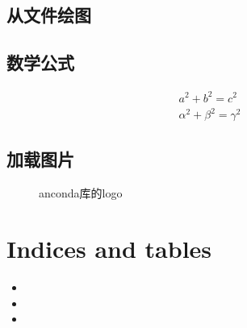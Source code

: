 \documentclass[letterpaper,10pt,english]{sphinxmanual}
\begin{document}
\begin{figure}[htbp]
\centering

\noindent{}
\end{figure}


\section{从文件绘图}
\label{\detokenize{index:id6}}
\begin{figure}[htbp]
\centering

\noindent{}
\end{figure}


\section{数学公式}
\label{\detokenize{index:id7}}\begin{equation*}
\begin{split}a^2 + b^2 = c^2 \\
\alpha^2 + \beta^2 = \gamma^2\end{split}
\end{equation*}

\section{加载图片}
\label{\detokenize{index:id8}}
\noindent{}

\begin{figure}[htbp]
\centering
\capstart

\noindent{}
\caption{anconda库的logo}\label{\detokenize{index:id9}}\end{figure}


\chapter{Indices and tables}
\label{\detokenize{index:indices-and-tables}}\begin{itemize}
\item {} 

\item {} 

\item {} 

\end{itemize}



\renewcommand{\indexname}{Index}
\printindex
\end{document}
